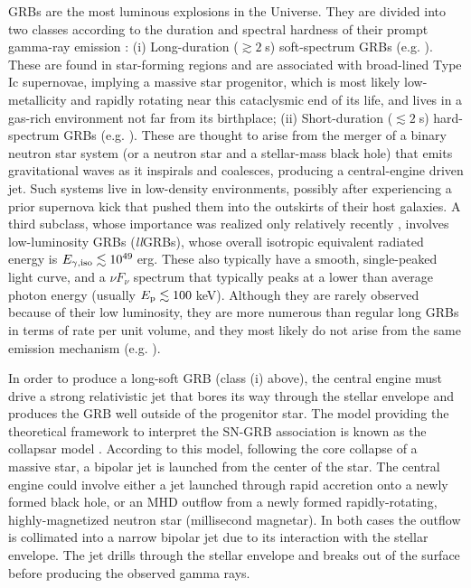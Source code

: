\documentclass[useAMS,usenatbib]{mn2e}
\begin{document}
GRBs are the most luminous explosions in the Universe. They are divided into two classes according to the duration and spectral hardness of their prompt gamma-ray emission \citep{Kouveliotou1993}: 
(i) Long-duration ($\gtrsim2\;$s) soft-spectrum
GRBs (e.g. \citealt{WoosleyBloom2006,KumarZhang2015}). These are found in star-forming regions and are associated with broad-lined
Type Ic supernovae, implying a massive star progenitor, which is most likely low-metallicity and rapidly rotating near this cataclysmic end of its life, and lives in a gas-rich environment not far from its birthplace; (ii) Short-duration ($\lesssim2\;$s) hard-spectrum GRBs (e.g. \citealt{Nakar2007}). These are thought to arise from the merger of a binary neutron star system (or a neutron star and a stellar-mass black hole) that emits gravitational waves as it inspirals and coalesces, producing a central-engine driven jet. Such systems live in low-density environments, possibly after experiencing a prior supernova kick that pushed them into the outskirts of their host galaxies. A third subclass, whose importance was realized only relatively recently
\citep{Soderberg2006,Campana2006,Bromberg2011b,NakarSari2012}, involves low-luminosity GRBs ({\it ll}GRBs), whose overall isotropic equivalent radiated energy is $E_{\rm\gamma,iso}\lesssim 10^{49}\;$erg. These also typically have a smooth, single-peaked light curve, and a $\nu F_\nu$ spectrum that typically peaks at a lower than average photon energy (usually $E_{\rm p} \lesssim 100\;$keV). Although they are rarely observed because of their low luminosity, they are more numerous than regular long GRBs in terms of rate per unit volume, and they most likely do not arise from the same emission mechanism (e.g. \citealt{Bromberg2011b,NakarSari2012}).

In order to produce a long-soft GRB (class (i) above), the central engine must drive a strong relativistic jet that bores its way through the stellar envelope and produces the GRB well outside of the progenitor star. The model providing the theoretical framework to interpret the SN-GRB association is known as the collapsar model \citep{MacfadyenWoosley1999, Macfadyen2001}. According to this model, following the core collapse of a massive star, a bipolar jet is launched from the center of the star. The central engine could involve either a jet launched through rapid accretion onto a newly formed black hole, or an MHD outflow from a newly formed rapidly-rotating, highly-magnetized neutron star (millisecond magnetar). In both cases the outflow is collimated into a narrow bipolar jet due to its interaction with the stellar envelope. The jet drills through the stellar envelope and breaks out of the surface before producing the observed gamma rays. 
\end{document}
